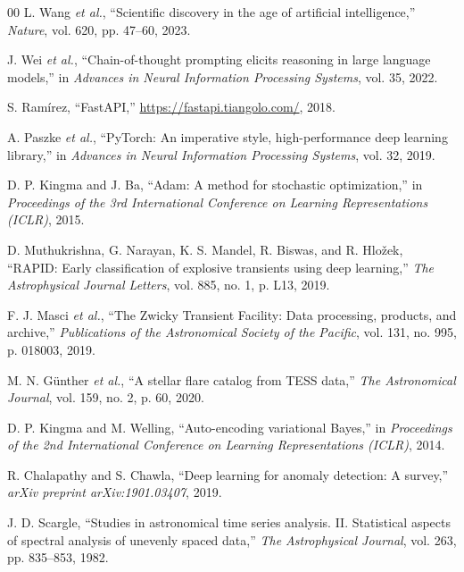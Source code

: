 \documentclass[conference]{IEEEtran}
\begin{document}
\begin{thebibliography}{00}
L. Wang \textit{et al.}, ``Scientific discovery in the age of artificial intelligence,'' \textit{Nature}, vol. 620, pp. 47--60, 2023.

J. Wei \textit{et al.}, ``Chain-of-thought prompting elicits reasoning in large language models,'' in \textit{Advances in Neural Information Processing Systems}, vol. 35, 2022.

S. Ram\'{i}rez, ``FastAPI,'' \url{https://fastapi.tiangolo.com/}, 2018.

A. Paszke \textit{et al.}, ``PyTorch: An imperative style, high-performance deep learning library,'' in \textit{Advances in Neural Information Processing Systems}, vol. 32, 2019.

D. P. Kingma and J. Ba, ``Adam: A method for stochastic optimization,'' in \textit{Proceedings of the 3rd International Conference on Learning Representations (ICLR)}, 2015.

D. Muthukrishna, G. Narayan, K. S. Mandel, R. Biswas, and R. Hlo\v{z}ek, ``RAPID: Early classification of explosive transients using deep learning,'' \textit{The Astrophysical Journal Letters}, vol. 885, no. 1, p. L13, 2019.

F. J. Masci \textit{et al.}, ``The Zwicky Transient Facility: Data processing, products, and archive,'' \textit{Publications of the Astronomical Society of the Pacific}, vol. 131, no. 995, p. 018003, 2019.

M. N. G\"{u}nther \textit{et al.}, ``A stellar flare catalog from TESS data,'' \textit{The Astronomical Journal}, vol. 159, no. 2, p. 60, 2020.

D. P. Kingma and M. Welling, ``Auto-encoding variational Bayes,'' in \textit{Proceedings of the 2nd International Conference on Learning Representations (ICLR)}, 2014.

R. Chalapathy and S. Chawla, ``Deep learning for anomaly detection: A survey,'' \textit{arXiv preprint arXiv:1901.03407}, 2019.

J. D. Scargle, ``Studies in astronomical time series analysis. II. Statistical aspects of spectral analysis of unevenly spaced data,'' \textit{The Astrophysical Journal}, vol. 263, pp. 835--853, 1982.

\end{thebibliography}
\end{document}
